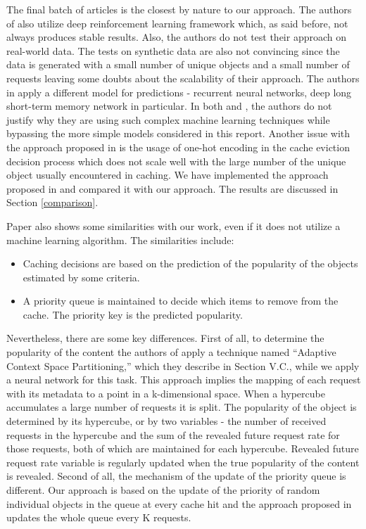 The final batch of articles is the closest by nature to our approach. The authors of \cite{22} also utilize deep reinforcement learning framework which, as said before, not always produces stable results. Also, the authors do not test their approach on real-world data. The tests on synthetic data are also not convincing since the data is generated with a small number of unique objects and a small number of requests leaving some doubts about the scalability of their approach. The authors in \cite{23} apply a different model for predictions - recurrent neural networks, deep long short-term memory network in particular. In both \cite{22} and \cite{23}, the authors do not justify why they are using such complex machine learning techniques while bypassing the more simple models considered in this report. Another issue with the approach proposed in \cite{23} is the usage of one-hot encoding in the cache eviction decision process which does not scale well with the large number of the unique object usually encountered in caching. We have implemented the approach proposed in \cite{23} and compared it with our approach. The results are discussed in Section \ref{comparison}. 

Paper \cite{25} also shows some similarities with our work, even if it does not utilize a machine learning algorithm. The similarities include:
\begin{itemize}
	\item Caching decisions are based on the prediction of the popularity of the objects estimated by some criteria.
	\item A priority queue is maintained to decide which items to remove from the cache. The priority key is the predicted popularity.
\end{itemize}
Nevertheless, there are some key differences. First of all, to determine the popularity of the content the authors of \cite{25} apply a technique named ``Adaptive Context Space Partitioning,'' which they describe in Section V.C.,  while we apply a neural network for this task. This approach implies the mapping of each request with its metadata to a point in a k-dimensional space. When a hypercube accumulates a large number of requests it is split. The popularity of the object is determined by its hypercube, or by two variables - the number of received requests in the hypercube and the sum of the revealed future request rate for those requests, both of which are maintained for each hypercube. Revealed future request rate variable is regularly updated when the true popularity of the content is revealed. Second of all, the mechanism of the update of the priority queue is different. Our approach is based on the update of the priority of random individual objects in the queue at every cache hit and the approach proposed in \cite{25} updates the whole queue every K requests.

